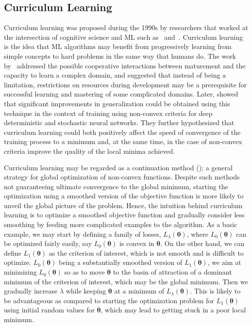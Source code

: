 \documentclass[11pt]{article}
\numberwithin{equation}{section}
\theoremstyle{plain}
\theoremstyle{definition}
\begin{document}
\subsection{Curriculum Learning}
\label{subsec:Curriculum Learning}
Curriculum learning was proposed during the 1990s by researchers that worked at the intersection of cognitive science and ML such as~\cite{ELMAN199371} and~\cite{rohde}. Curriculum learning is the idea that ML algorithms may benefit from progressively learning from simple concepts to hard problems in the same way that humans do. The work by~\cite{ELMAN199371} addressed the possible cooperative interactions between maturement and the capacity to learn a complex domain, and suggested that instead of being a limitation, restrictions on resources during development may be a prerequisite for successful learning and mastering of some complicated domains. Later, \cite{cl_bengio} showed that significant improvements in generalization could be obtained using this technique in the context of training using non-convex criteria for deep deterministic and stochastic neural networks. They further hypothesized that curriculum learning could both positively affect the speed of convergence of the training process to a minimum and, at the same time, in the case of non-convex criteria improve the quality of the local minima achieved.

Curriculum learning may be regarded as a continuation method (\cite{continuation}); a general strategy for global optimization of non-convex functions. Despite such methods not guaranteeing ultimate convergence to the global minimum, starting the optimization using a smoothed version of the objective function is more likely to unveil the global picture of the problem. Hence, the intuition behind curriculum learning is to optimize a smoothed objective function and gradually consider less
smoothing by feeding more complicated examples to the algorithm. As a basic example, we may start by defining a family of losses, $L_{\lambda}(\boldsymbol{\theta})$, where $L_{0}(\boldsymbol{\theta})$ can be optimized fairly easily, say $L_{0}(\boldsymbol{\theta})$ is convex in $\boldsymbol{\theta}$. On the other hand, we can define $L_{1}(\boldsymbol{\theta})$ as the criterion of interest, which is not smooth and is difficult to optimize. $L_{0}(\boldsymbol{\theta})$ being a substantially smoothed version of $L_{1}(\boldsymbol{\theta})$, we aim at minimizing $L_{0}(\boldsymbol{\theta})$ so as to move $\boldsymbol{\theta}$ to the basin of attraction of a dominant minimum of the criterion of interest, which may be the global minimum. Then we gradually increase $\lambda$ while keeping $\boldsymbol{\theta}$ at a minimum of $L_{\lambda}(\boldsymbol{\theta})$. This is likely to be advantageous as compared to starting the optimization problem for $L_{1}(\boldsymbol{\theta})$ using initial random values for $\boldsymbol{\theta}$, which may lead to getting stuck in a poor local minimum.
\end{document}
